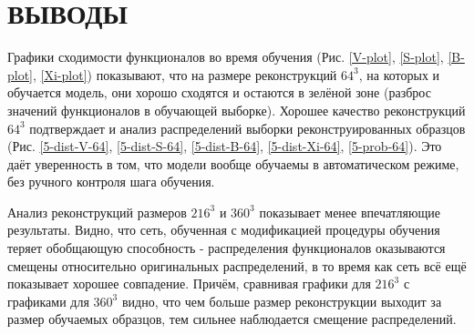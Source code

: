 \clearpage
\section*{\hfil ВЫВОДЫ \hfil}
	Графики сходимости функционалов во время обучения (Рис. \ref{V-plot}, \ref{S-plot}, \ref{B-plot}, \ref{Xi-plot}) показывают, что на размере реконструкций $64^3$, на которых и обучается модель, они хорошо сходятся и остаются в зелёной зоне (разброс значений функционалов в обучающей выборке). Хорошее качество реконструкций $64^3$ подтверждает и анализ распределений выборки реконструированных образцов (Рис. \ref{5-dist-V-64}, \ref{5-dist-S-64}, \ref{5-dist-B-64}, \ref{5-dist-Xi-64}, \ref{5-prob-64}). Это даёт уверенность в том, что модели вообще обучаемы в автоматическом режиме, без ручного контроля шага обучения.
	
	Анализ реконструкций размеров $216^3$ и $360^3$ показывает менее впечатляющие результаты. Видно, что сеть, обученная с модификацией процедуры обучения теряет обобщающую способность - распределения функционалов оказываются смещены относительно оригинальных распределений, в то время как сеть \cite{Mosser} всё ещё показывает хорошее совпадение. Причём, сравнивая графики для $216^3$ с графиками для $360^3$ видно, что чем больше размер реконструкции выходит за размер обучаемых образцов, тем сильнее наблюдается смещение распределений.
	